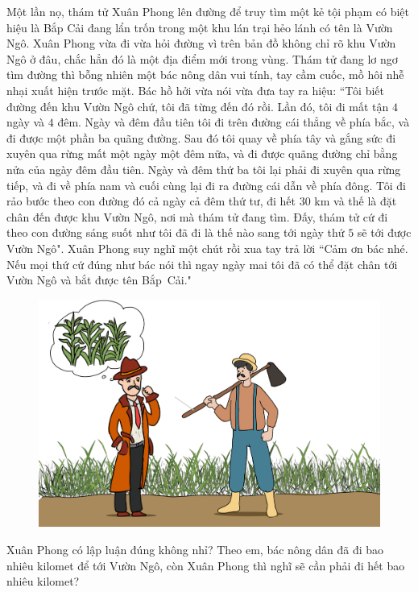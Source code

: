 \begin{multicols}{2}
	Một lần nọ, thám tử Xuân Phong lên đường để truy tìm một kẻ tội phạm có biệt hiệu là Bắp Cải đang lẩn trốn trong một khu lán trại hẻo lánh có tên là Vườn Ngô. Xuân Phong vừa đi vừa hỏi đường vì trên bản đồ không chỉ rõ khu Vườn Ngô ở đâu, chắc hẳn đó là một địa điểm mới trong vùng. Thám tử đang lơ ngơ tìm đường thì bỗng nhiên một bác nông dân vui tính, tay cầm cuốc, mồ hôi nhễ nhại xuất hiện trước mặt. Bác hồ hởi vừa nói vừa đưa tay ra hiệu: ``Tôi biết đường đến khu Vườn Ngô chứ, tôi đã từng đến đó rồi. Lần đó, tôi đi mất  tận $4$ ngày và $4$ đêm. Ngày và đêm đầu tiên tôi đi trên đường cái thẳng về phía bắc, và đi được một phần ba quãng đường. Sau đó tôi quay về phía tây và gắng sức đi xuyên qua rừng mất một ngày một đêm nữa, và đi được quãng đường chỉ bằng nửa của ngày đêm đầu tiên. Ngày và đêm thứ ba tôi lại phải đi xuyên qua rừng tiếp, và đi về phía nam và cuối cùng lại đi ra đường cái dẫn về phía đông. Tôi đi rảo bước theo con đường đó cả ngày cả đêm thứ tư, đi hết $30$ km và thế là đặt chân đến được khu Vườn Ngô, nơi mà thám tử đang tìm. Đấy, thám tử cứ đi theo con đường sáng suốt như tôi đã đi là thế nào sang tới ngày thứ $5$ sẽ tới được Vườn Ngô".
	\vskip 0.1cm
	Xuân Phong suy nghĩ một chút rồi xua tay trả lời ``Cảm ơn bác nhé. Nếu mọi thứ cứ đúng như bác nói thì ngay ngày mai tôi đã có thể đặt chân tới Vườn Ngô và bắt được tên Bắp~Cải."
	\begin{figure}[H]
		\centering
		\vspace*{-5pt}
		\captionsetup{labelformat= empty, justification=centering}
		\includegraphics[width=1\linewidth]{xp}
		\vspace*{-15pt}
	\end{figure}
	Xuân Phong có lập luận đúng không nhỉ? Theo em, bác nông dân đã đi bao nhiêu kilomet để tới Vườn Ngô, còn Xuân Phong thì nghĩ sẽ cần phải đi hết bao nhiêu kilomet?
\end{multicols}
